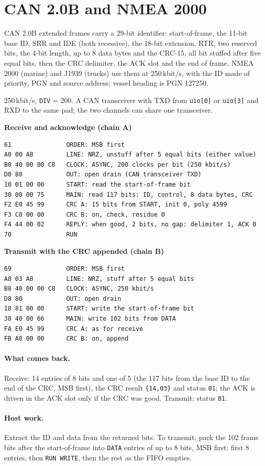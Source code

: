 \documentclass[11pt,a4paper]{article}
\newcommand{\sig}[1]{\texttt{#1}}
\newcommand{\progtitle}[1]{\par\smallskip\textbf{\small\color{accent}#1}\par\nopagebreak}
\newcommand{\facts}[1]{\par\noindent\colorbox{codebg}{\parbox{\dimexpr\linewidth-2\fboxsep}{\small #1}}\par}
\begin{document}
\section{CAN 2.0B and NMEA 2000}
CAN 2.0B extended frames carry a 29-bit identifier: start-of-frame, the 11-bit base ID, SRR and IDE (both recessive), the 18-bit extension, RTR, two reserved bits, the 4-bit length, up to 8 data bytes and the CRC-15, all bit stuffed after five equal bits, then the CRC delimiter, the ACK slot and the end of frame. NMEA 2000 (marine) and J1939 (trucks) use them at 250\,kbit/s, with the ID made of priority, PGN and source address; vessel heading is PGN 127250.
\facts{250\,kbit/s, \sig{DIV} = 200. A CAN transceiver with TXD from \sig{uio[0]} or \sig{uio[3]} and RXD to the same pad; the two channels can share one transceiver.}
\progtitle{Receive and acknowledge (chain A)}
\begin{lstlisting}
61               ORDER: MSB first
A0 00 A8         LINE: NRZ, unstuff after 5 equal bits (either value)
B0 40 00 00 C8   CLOCK: ASYNC, 200 clocks per bit (250 kbit/s)
D0 80            OUT: open drain (CAN transceiver TXD)
10 01 00 00      START: read the start-of-frame bit
30 00 00 75      MAIN: read 117 bits: ID, control, 8 data bytes, CRC
F2 E0 45 99      CRC A: 15 bits from START, init 0, poly 4599
F3 C0 00 00      CRC B: on, check, residue 0
F4 44 00 02      REPLY: when good, 2 bits, no gap: delimiter 1, ACK 0
70               RUN
\end{lstlisting}
\progtitle{Transmit with the CRC appended (chain B)}
\begin{lstlisting}
69               ORDER: MSB first
A8 03 A8         LINE: NRZ, stuff after 5 equal bits
B8 40 00 00 C8   CLOCK: ASYNC, 250 kbit/s
D8 80            OUT: open drain
18 81 00 00      START: write the start-of-frame bit
38 40 00 66      MAIN: write 102 bits from DATA
FA E0 45 99      CRC A: as for receive
FB A0 00 00      CRC B: on, append
\end{lstlisting}
\paragraph{What comes back.} Receive: 14 entries of 8 bits and one of 5 (the 117 bits from the base ID to the end of the CRC, MSB first), the CRC result \texttt{\{14,03\}} and status \texttt{01}; the ACK is driven in the ACK slot only if the CRC was good. Transmit: status \texttt{01}.

\paragraph{Host work.} Extract the ID and data from the returned bits. To transmit, pack the 102 frame bits after the start-of-frame into \sig{DATA} entries of up to 8 bits, MSB first: first 8 entries, then \sig{RUN WRITE}, then the rest as the FIFO empties.
\end{document}
